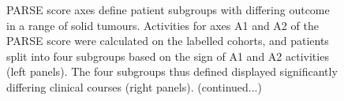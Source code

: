 \documentclass[dissertation.tex]{subfiles}
\begin{document}
\begin{figure}[!htbp]
  \caption[Survival subgroups defined by \texorpdfstring{\acrshort{PARSE}}{PARSE} score axes in different tumours]{\acrshort{PARSE} score axes define patient subgroups with differing outcome in a range of solid tumours.  Activities for axes A1 and A2 of the \acrshort{PARSE} score were calculated on the labelled cohorts, and patients split into four subgroups based on the sign of A1 and A2 activities (left panels).  The four subgroups thus defined displayed significantly differing clinical courses (right panels).  (continued...)}\label{fig:sigs-km}
\end{figure}
\end{document}
